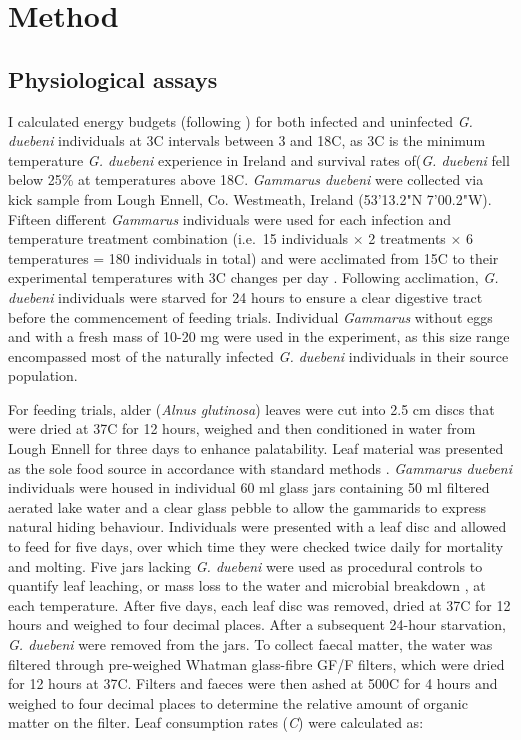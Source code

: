 \section{Method}

\subsection{Physiological assays}

I calculated energy budgets (following \citet{nilsson1974}) for both infected and uninfected \emph{G. duebeni} individuals at 3\degree C intervals between 3 and 18\degree C, as 3\degree C is the minimum temperature \emph{G. duebeni} experience in Ireland and survival rates of(\emph{G. duebeni} fell below 25\% at temperatures above 18\degree C. \emph{Gammarus duebeni} were collected via kick sample from Lough Ennell, Co. Westmeath, Ireland (53'13.2"N 7'00.2"W). Fifteen different \emph{Gammarus} individuals were used for each infection and temperature treatment combination (i.e.\ 15 individuals $\times$ 2 treatments $\times$ 6 temperatures = 180 individuals in total) and were acclimated from 15\degree C to their experimental temperatures with 3\degree C changes per day \citep{penk2016}. Following acclimation, \emph{G. duebeni} individuals were starved for 24 hours to ensure a clear digestive tract before the commencement of feeding trials. Individual \emph{Gammarus} without eggs and with a fresh mass of 10-20 mg were used in the experiment, as this size range encompassed most of the naturally infected \emph{G. duebeni} individuals in their source population.

For feeding trials, alder (\emph{Alnus glutinosa})  leaves were cut into 2.5 cm discs that were dried at 37\degree C for 12 hours, weighed and then conditioned in water from Lough Ennell for three days to enhance palatability. Leaf material was presented as the sole food source in accordance with standard methods \citep{agatz2014}. \emph{Gammarus duebeni} individuals were housed in individual 60 ml glass jars containing 50 ml filtered aerated lake water and a clear glass pebble to allow the gammarids to express natural hiding behaviour. Individuals were presented with a leaf disc and allowed to feed for five days, over which time they were checked twice daily for mortality and molting. Five jars lacking \emph{G. duebeni} were used as procedural controls to quantify leaf leaching, or mass loss to the water and microbial breakdown \citep{webster1986}, at each temperature. After five days, each leaf disc was removed, dried at 37\degree C for 12 hours and weighed to four decimal places. After a subsequent 24-hour starvation, \emph{G. duebeni} were removed from the jars. To collect faecal matter, the water was filtered through pre-weighed Whatman glass-fibre GF/F filters, which were dried for 12 hours at 37\degree C. Filters and faeces were then ashed at 500\degree C for 4 hours and weighed to four decimal places to determine the relative amount of organic matter on the filter.  Leaf consumption rates (\emph{C}) were calculated as:

